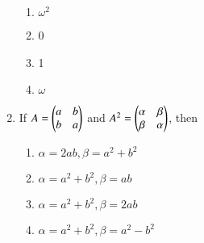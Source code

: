 \documentclass[journal]{IEEEtran}
\numberwithin{equation}{enumi}
\numberwithin{figure}{enumi}
\begin{document}
\begin{enumerate}
        \hfill{}
        
        \begin{enumerate}
		\item $\omega^{2}$ 
                \item 0                      
                \item 1
                \item $\omega$
        \end{enumerate}


\item
        If $A=\begin{pmatrix}a & b \\ b & a\end{pmatrix}$ and $A^{2}=\begin{pmatrix}\alpha & \beta \\ \beta & \alpha\end{pmatrix}$, then 
        
        \hfill{}
                                             
        \begin{enumerate}
		\item $\alpha=2ab, \beta=a^{2}+b^{2}$
                \item $\alpha=a^{2}+b^{2}, \beta=ab$
                \item $\alpha=a^{2}+b^{2}, \beta=2ab$
                \item $\alpha=a^{2}+b^{2}, \beta=a^{2}-b^{2}$
        \end{enumerate}

		
\end{enumerate}
\end{document}
